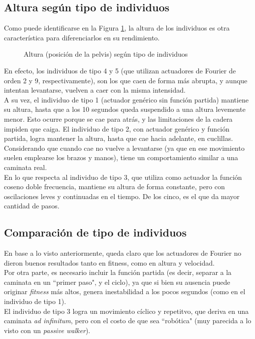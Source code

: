 \documentclass{article}
\begin{document}
\subsection{Altura seg\'un tipo de individuos}
Como puede identificarse en la Figura \ref{fig:resultados_altura}, la altura de los individuos es otra caracter\'istica para diferenciarlos en su rendimiento.
\begin{figure}[H]%
  \centering
  \caption{Altura (posici\'on de la pelvis) seg\'un tipo de individuos}%
  \label{fig:resultados_altura} %
\end{figure}
\noindent En efecto, los individuos de tipo 4 y 5 (que utilizan actuadores de Fourier de orden 2 y 9, respectivamente), son los que caen de forma m\'as abrupta, y aunque intentan levantarse, vuelven a caer con la misma intensidad. \\
A su vez, el individuo de tipo 1 (actuador gen\'erico sin funci\'on partida) mantiene su altura, hasta que a los 10 segundos queda suspendido a una altura levemente menor. Esto ocurre porque se cae para atr\'as, y las limitaciones de la cadera impiden que caiga. El individuo de tipo 2, con actuador gen\'erico y funci\'on partida, logra mantener la altura, hasta que cae hacia adelante, en cuclillas. Considerando que cuando cae no vuelve a levantarse (ya que en ese movimiento suelen emplearse los brazos y manos), tiene un comportamiento similar a una caminata real. \\
En lo que respecta al individuo de tipo 3, que utiliza como actuador la funci\'on coseno doble frecuencia, mantiene su altura de forma constante, pero con oscilaciones leves y continuadas en el tiempo. De los cinco, es el que da mayor cantidad de pasos.


\subsection{Comparaci\'on de tipo de individuos}
En base a lo visto anteriormente, queda claro que los actuadores de Fourier no dieron buenos resultados tanto en fitness, como en altura y velocidad.\\
Por otra parte, es necesario incluir la funci\'on partida (es decir, separar a la caminata en un ``primer paso", y el ciclo), ya que si bien su ausencia puede originar \textit{fitness} m\'as altos, genera inestabilidad a los pocos segundos (como en el individuo de tipo 1).\\
El individuo de tipo 3 logra un movimiento c\'iclico y repetitvo, que deriva en una caminata \textit{ad infinitum}, pero con el costo de que sea ``rob\'otica" (muy parecida a lo visto con un \textit{passive walker}). 
\end{document}
